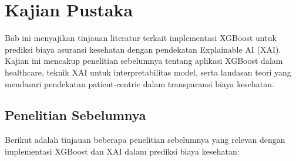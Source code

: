 \chapter{Kajian Pustaka}

Bab ini menyajikan tinjauan literatur terkait implementasi XGBoost untuk prediksi biaya asuransi kesehatan dengan pendekatan Explainable AI (XAI). Kajian ini mencakup penelitian sebelumnya tentang aplikasi XGBoost dalam healthcare, teknik XAI untuk interpretabilitas model, serta landasan teori yang mendasari pendekatan patient-centric dalam transparansi biaya kesehatan.

\section{Penelitian Sebelumnya}
Berikut adalah tinjauan beberapa penelitian sebelumnya yang relevan dengan implementasi XGBoost dan XAI dalam prediksi biaya kesehatan:

